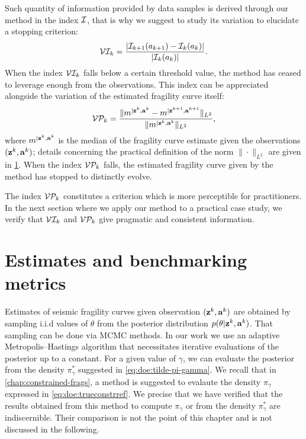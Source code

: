 Such quantity of information provided by data samples is derived through our method in the index $\mathcal{I}$, that is why we suggest to study its variation to elucidate a {stopping} criterion:
\begin{equation}
    \mathcal{V}\mathcal{I}_k = \frac{|\mathcal{I}_{k+1}(a_{k+1})-\mathcal{I}_k(a_k)|}{|\mathcal{I}_k(a_k)|}.
\end{equation}
When the index $\mathcal{V}\mathcal{I}_k$ falls below a certain threshold value, the method has ceased to leverage enough from the observations.
This index can be appreciated alongside the variation of the estimated fragility curve itself:
    \begin{equation}
            \mathcal{V}\mathcal{P}_k = \frac{\|m^{|\mathbf{z}^k,\mathbf{a}^k} - m^{|\mathbf{z}^{k+1},\mathbf{a}^{k+1}}\|_{L^2}}{\|m^{|\mathbf{z}^k,\mathbf{a}^k}\|_{L^2}},
    \end{equation}
where $m^{|\mathbf{z}^k,\mathbf{a}^k}$ is the median of the fragility curve estimate given the observations $(\mathbf{z}^k,\mathbf{a}^k)$; details concerning the practical definition of the norm $\|\cdot\|_{L^2}$ are given in \cref{sec:doe:metrics}.
When the index $\mathcal{V}\mathcal{P}_k $ falls, the estimated fragility curve given by the method has stopped to distinctly evolve.

The index $\mathcal{V}\mathcal{P}_k$ constitutes a criterion which is more perceptible {for practitioners}.
In the next section where we apply our method to a practical case study,{ we verify that $\mathcal{V}\mathcal{I}_k$ and $\mathcal{V}\mathcal{P}_k$ give pragmatic and consistent information.}





\section{Estimates and benchmarking metrics}\label{sec:doe:metrics}




Estimates of seismic fragility curves given observation $(\mathbf{z}^k,\mathbf{a}^k)$ are obtained by sampling i.i.d values of $\theta$ from the posterior distribution $p(\theta|\mathbf{z}^k,\mathbf{a}^k)$. That sampling can be done via MCMC methods. In our work we use an adaptive Metropolis–Hastings algorithm \citep{haario_adaptive_2001} that necessitates iterative evaluations of the posterior up to a constant.
For a given value of $\gamma$, we can evaluate the posterior from the density $\pi^\ast_\gamma$ suggested in \cref{eq:doe:tilde-pi-gamma}. 
We recall that in \cref{chap:constrained-frags}, a method is suggested to evalaute the density $\pi_\gamma$ expressed in \cref{eq:doe:trueconstrref}.
We precise that we have verified that the results obtained from this method to compute $\pi_\gamma$ or from 
the density $\pi^\ast_\gamma$ are indiscernible. Their comparison is not the point of this chapter and is not discussed in the following.

